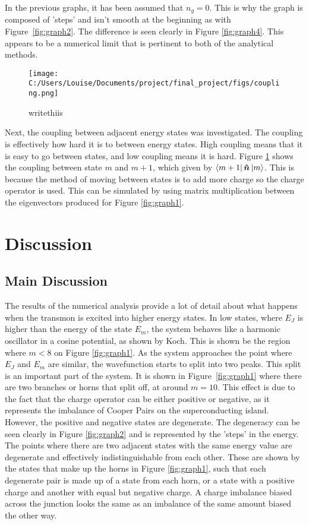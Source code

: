 \documentclass[11pt]{article}
\begin{document}
In the previous graphs, it has been assumed that $n_g = 0$. This is why the graph is composed of 'steps' and isn't smooth at the beginning as with Figure~\ref{fig:graph2}. The difference is seen clearly in Figure  \ref{fig:graph4}. This appears to be a numerical limit that is pertinent to both of the analytical methods.

\begin{figure}[!ht]
\centering
\texttt{[image: C:/Users/Louise/Documents/project/final\_project/figs/coupling.png]}
\caption{writethiis}
\label{fig:graph5}
\end{figure}
Next, the coupling between adjacent energy states was investigated. The coupling is effectively how hard it is to between energy states. High coupling means that it is easy to go between states, and low coupling means it is hard. Figure \ref{fig:graph5} shows the coupling between state $m$ and $m+1$, which given by $\bra{m+1}\boldsymbol{\hat{n}}\ket{m}$. This is because the method of moving between states is to add more charge so the charge operator is used. This can be simulated by using matrix multiplication between the eigenvectors produced for Figure \ref{fig:graph1}.

\section{Discussion}
\subsection{Main Discussion}
The results of the numerical analysis provide a lot of detail about what happens when the transmon is excited into higher energy states. In low states, where $E_J$ is higher than the energy of the state $E_m$, the system behaves like a harmonic oscillator in a cosine potential, as shown by Koch. This is shown be the region where $m<8$ on Figure \ref{fig:graph1}. As the system approaches the point where $E_J$ and $E_m$ are similar, the wavefunction starts to split into two peaks. This split is an important part of the system. It is shown in Figure~\ref{fig:graph1} where there are two branches or horns that split off, at around $m=10$. This effect is due to the fact that the charge operator can be either positive or negative, as it represents the imbalance of Cooper Pairs on the superconducting island. However, the positive and negative states are degenerate. The degeneracy can be seen clearly in Figure \ref{fig:graph2} and is represented by the 'steps' in the energy. The points where there are two adjacent states with the same energy value are degenerate and effectively indistinguishable from each other. These are shown by the states that make up the horns in Figure \ref{fig:graph1}, such that each degenerate pair is made up of a state from each horn, or a state with a positive charge and another with equal but negative charge. A charge imbalance biased across the junction looks the same as an imbalance of the same amount biased the other way.
\end{document}
